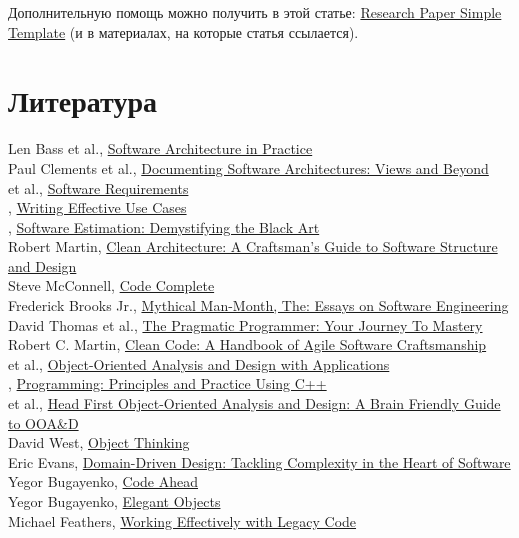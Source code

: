 \documentclass[nobrand,anonymous,nodate,nosecurity]{huawei}
\begin{document}
{Дополнительную помощь можно получить в этой статье:
\href{https://www.yegor256.com/2022/08/24/research-paper-template.html}{Research Paper Simple Template}
(и в материалах, на которые статья ссылается).

\section{Литература}

\begin{multicols}{2}\small\raggedright
Len Bass et al., \ul{Software Architecture in Practice}\\[3pt]
Paul Clements et al., \ul{Documenting Software Architectures: Views and Beyond}\\[3pt]
 et al., \ul{Software Requirements}\\[3pt]
{}, \ul{Writing Effective Use Cases}\\[3pt]
{}, \ul{Software Estimation: Demystifying the Black Art}\\[3pt]
{Robert Martin}, \ul{Clean Architecture: A Craftsman's Guide to Software Structure and Design}\\[3pt]
{Steve McConnell}, \ul{Code Complete}\\[3pt]
{Frederick Brooks Jr.}, \ul{Mythical Man-Month, The: Essays on Software Engineering}\\[3pt]
{David Thomas et al.}, \ul{The Pragmatic Programmer: Your Journey To Mastery}\\[3pt]
{Robert C. Martin}, \ul{Clean Code: A Handbook of Agile Software Craftsmanship}\\[3pt]
{ et al.}, \ul{Object-Oriented Analysis and Design with Applications}\\[3pt]
{}, \ul{Programming: Principles and Practice Using C++}\\[3pt]
{ et al.}, \ul{Head First Object-Oriented Analysis and Design: A Brain Friendly Guide to OOA\&D}\\[3pt]
{David West}, \ul{Object Thinking}\\[3pt]
{Eric Evans}, \ul{Domain-Driven Design: Tackling Complexity in the Heart of Software}\\[3pt]
{Yegor Bugayenko}, \ul{Code Ahead}\\[3pt]
{Yegor Bugayenko}, \ul{Elegant Objects}\\[3pt]
{Michael Feathers}, \ul{Working Effectively with Legacy Code}\\[3pt]

\end{multicols}}
\end{document}
